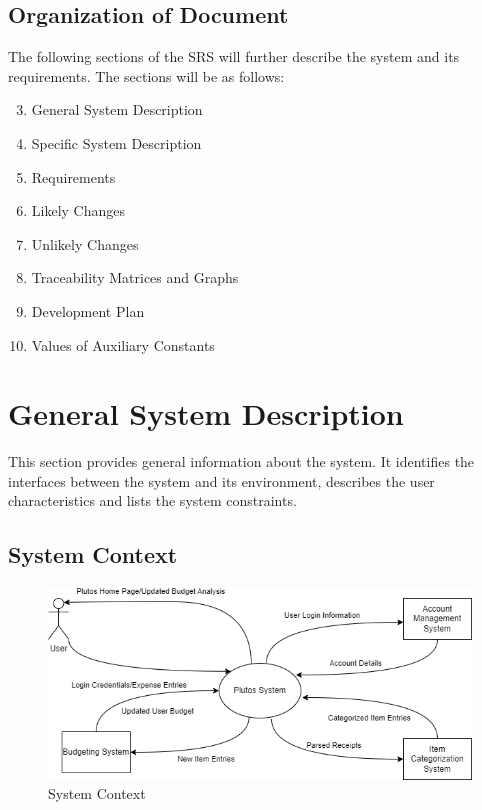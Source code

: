 \documentclass[12pt]{article}
\begin{document}
\subsection{Organization of Document}

The following sections of the SRS will further describe the system and its requirements. The sections will be as follows:

\begin{enumerate}
	\setcounter{enumi}{2}
	\item General System Description
	\item Specific System Description
	\item Requirements
	\item Likely Changes
	\item Unlikely Changes
	\item Traceability Matrices and Graphs
	\item Development Plan
	\item Values of Auxiliary Constants
\end{enumerate}

\newpage

\section{General System Description}

This section provides general information about the system.  It identifies the
interfaces between the system and its environment, describes the user
characteristics and lists the system constraints.

\subsection{System Context}

\begin{figure}[h!]
  \centering
   \includegraphics[width=\textwidth]{SystemContext.png}
  \caption{System Context}
  \label{Fig_SystemContext} 
\end{figure}
\end{document}
